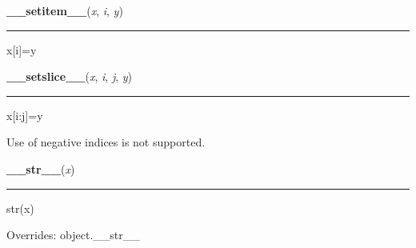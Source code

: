     \label{pygame:Rect:__setitem__}

    \vspace{0.5ex}

\hspace{.8\funcindent}\begin{boxedminipage}{\funcwidth}

    \raggedright \textbf{\_\_setitem\_\_}(\textit{x}, \textit{i}, \textit{y})

    \vspace{-1.5ex}

    \rule{\textwidth}{0.5\fboxrule}
\setlength{\parskip}{2ex}
    x[i]=y

\setlength{\parskip}{1ex}
    \end{boxedminipage}

    \label{pygame:Rect:__setslice__}

    \vspace{0.5ex}

\hspace{.8\funcindent}\begin{boxedminipage}{\funcwidth}

    \raggedright \textbf{\_\_setslice\_\_}(\textit{x}, \textit{i}, \textit{j}, \textit{y})

    \vspace{-1.5ex}

    \rule{\textwidth}{0.5\fboxrule}
\setlength{\parskip}{2ex}
    x[i:j]=y

    Use  of negative indices is not supported.

\setlength{\parskip}{1ex}
    \end{boxedminipage}

    \vspace{0.5ex}

\hspace{.8\funcindent}\begin{boxedminipage}{\funcwidth}

    \raggedright \textbf{\_\_str\_\_}(\textit{x})

    \vspace{-1.5ex}

    \rule{\textwidth}{0.5\fboxrule}
\setlength{\parskip}{2ex}
    str(x)

\setlength{\parskip}{1ex}
      Overrides: object.\_\_str\_\_

    \end{boxedminipage}

